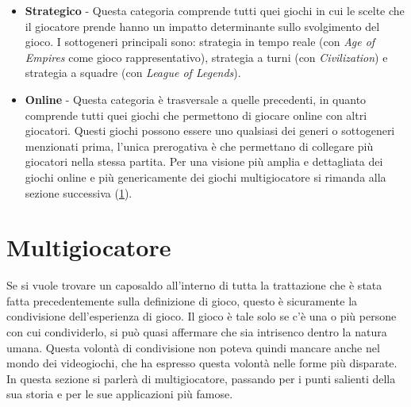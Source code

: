 \begin{itemize}
{                all'interno della stessa sessione un elevato numero di partecipanti, nell'ordine delle centinaia.} (con \textit{World of Warcraft}) e \textit{roguelike} (con \textit{The
                Binding of Isaac}).
            \item \textbf{Strategico} - Questa categoria comprende tutti quei giochi in cui le scelte che il giocatore prende hanno un impatto determinante sullo svolgimento del gioco.
                I sottogeneri principali sono: strategia in tempo reale (con \textit{Age of Empires} come gioco rappresentativo), strategia a turni (con \textit{Civilization}) e 
                strategia a squadre (con \textit{League of Legends}).
            \item \textbf{Online} - Questa categoria è trasversale a quelle precedenti, in quanto comprende tutti quei giochi che permettono di giocare online con altri giocatori. 
                Questi giochi possono essere uno qualsiasi dei generi o sottogeneri menzionati prima, l'unica prerogativa è che permettano di collegare più giocatori nella stessa partita.
                Per una visione più amplia e dettagliata dei giochi online e più genericamente dei giochi multigiocatore si rimanda alla sezione successiva (\ref{sec:Multigiocatore}).
        \end{itemize}

\section{Multigiocatore}\label{sec:Multigiocatore}
    Se si vuole trovare un caposaldo all'interno di tutta la trattazione che è stata fatta precedentemente sulla definizione di gioco, questo è sicuramente la condivisione dell'esperienza
    di gioco. Il gioco è tale solo se c'è una o più persone con cui condividerlo, si può quasi affermare che sia intrisenco dentro la natura umana. Questa volontà di condivisione 
    non poteva quindi mancare anche nel mondo dei videogiochi, che ha espresso questa volontà nelle forme più disparate. In questa sezione si parlerà di multigiocatore, passando per 
    i punti salienti della sua storia e per le sue applicazioni più famose.
